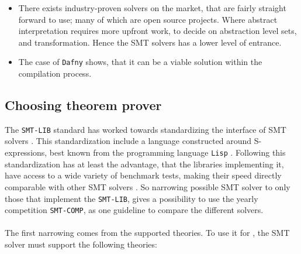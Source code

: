 \begin{itemize}
    \item There exists industry-proven solvers on the market, that are fairly straight forward
          to use; many of which are open source projects. Where abstract interpretation requires
          more upfront work, to decide on
          abstraction level sets, and transformation. Hence the SMT solvers has a lower level
          of entrance.

    \item The case of \texttt{Dafny} shows, that it can be a viable solution within the compilation
          process.
\end{itemize}


\subsection{Choosing theorem prover }
The \texttt{SMT-LIB} standard has worked towards standardizing the interface of SMT solvers \cite{smtlib}.
This standardization include a language constructed around S-expressions, best known from
the programming language \texttt{Lisp} \cite{pld}. Following this standardization has at least
the advantage, that the libraries implementing it, have access to a wide variety of benchmark tests,
making their speed directly comparable with other SMT solvers \cite{smtlib}. So narrowing possible
SMT solver to only those that implement the \texttt{SMT-LIB}, gives a possibility to use the
yearly competition \texttt{SMT-COMP}, as one guideline to compare the different solvers.
\\
\\
The first narrowing comes from the supported theories. To use it for \lan, the SMT solver must
support the following theories:

